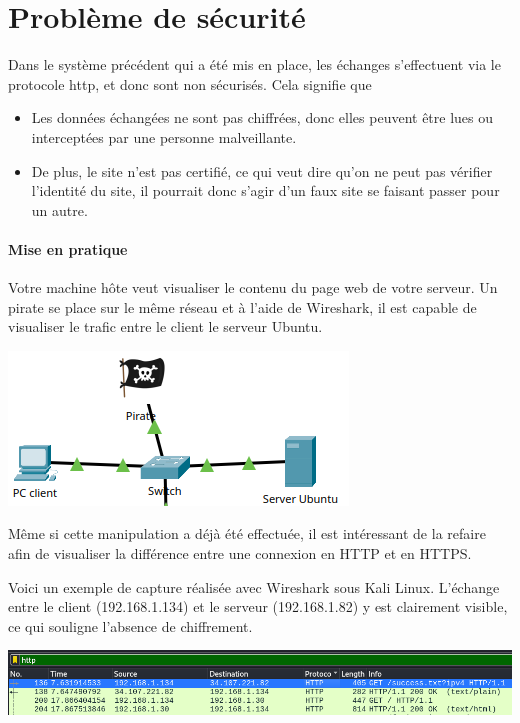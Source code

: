 \documentclass[french, 12pt]{article}%
\newcommand{\itemE}{\item[$\bullet$]}
\begin{document}
\tableofcontents
\newpage


\section{Problème de sécurité}
Dans le système précédent qui a été mis en place, les échanges s'effectuent via le protocole http, et donc sont non sécurisés. Cela signifie que
\begin{itemize}
\itemE Les données échangées ne sont pas chiffrées, donc elles peuvent être lues ou interceptées par une personne malveillante. 
\itemE De plus, le site n’est pas certifié, ce qui veut dire qu'on ne peut pas vérifier l'identité du site, il pourrait donc s'agir d'un faux site se faisant passer pour un autre.
\end{itemize} 

\paragraph{Mise en pratique}

Votre machine hôte veut visualiser le contenu du page web de votre serveur.  Un pirate se place sur le même réseau et à l'aide de Wireshark, il est capable de visualiser le trafic entre le client le serveur Ubuntu.
\begin{center}
\includegraphics[scale=0.7]{./ressource/topReseau.png}
\end{center}

Même si cette manipulation a déjà été effectuée, il est intéressant de la refaire afin de visualiser la différence entre une connexion en HTTP et en HTTPS.

Voici un exemple de capture réalisée avec Wireshark sous Kali Linux. L’échange entre le client (192.168.1.134) et le serveur (192.168.1.82) y est clairement visible, ce qui souligne l'absence de chiffrement. 
\begin{center}
\includegraphics[scale=0.5]{./ressource/captureWireshark}
\end{center}
\end{document}
